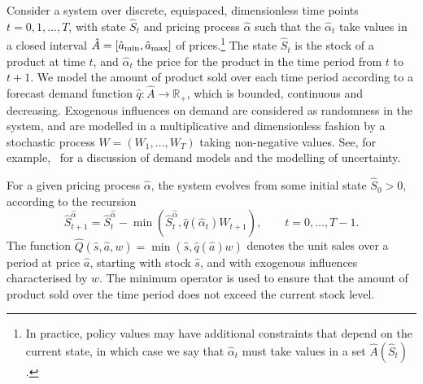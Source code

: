 \documentclass[main.tex]{subfiles}
\begin{document}
Consider a system over discrete, equispaced, dimensionless time points
$t=0,1,\dots,T$, with state
$\hat{S}_t$ and pricing process $\hat{\alpha}$ such that the $\hat{\alpha}_t$ take values in a closed
interval $\hat{A}=\nobreak[\hat{a}_{\mathrm{min}},\hat{a}_{\mathrm{max}}]$ of prices.\footnote{In
  practice, policy values may have additional constraints that depend
  on the current state,
  in which case we say that $\hat{\alpha}_t$ must take values
  in a set $\hat{A}(\hat{S}_t)$.
}
The state $\hat{S}_t$ is the stock of a product at time $t$, and
$\hat{\alpha}_t$ the price for the product in the time period from $t$ to
$t+1$. We model the amount of product sold over each time period according
to a forecast demand
function $\hat{q}:\hat{A}\to\mathbb{R}_+$, which is bounded, continuous and decreasing.
Exogenous influences on demand are considered as randomness in the
system, and are
modelled in a multiplicative and dimensionless fashion by a stochastic process
$W=(W_1,\dots,W_T)$ taking non-negative values. See, for
example,~\citet[Ch.~7]{talluri2006theory} for a discussion of
demand models and the modelling of uncertainty.

For a given pricing process $\hat{\alpha}$, the
system evolves from some initial state $\hat{S}_0>0$, according to the
recursion
\begin{equation}\label{eq:stock_dynamics}
  \hat{S}_{t+1}^{\hat{\alpha}}=\hat{S}_t^{\hat{\alpha}}-\min(\hat{S}_t^{\hat{\alpha}},\hat{q}(\hat{\alpha}_t)W_{t+1}),\qquad t=0,\dots,T-1.
\end{equation}
The function $\hat{Q}(\hat{s},\hat{a},w)=\min(\hat{s},\hat{q}(\hat{a})w)$ denotes the unit sales over a
period at price $\hat{a}$,
starting with stock $\hat{s}$, and with exogenous influences
characterised by $w$. The minimum operator is used to ensure that the
amount of product sold over the time period does not exceed the
current stock level.
\end{document}
